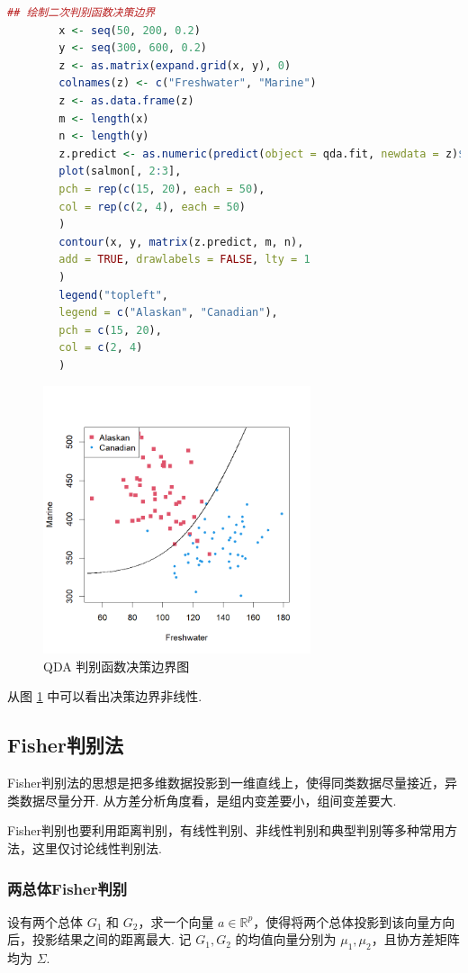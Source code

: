 \documentclass[12pt, a4paper, oneside]{ctexart}
\begin{document}
	\begin{lstlisting}[language=R]
		## 绘制二次判别函数决策边界
		x <- seq(50, 200, 0.2)
		y <- seq(300, 600, 0.2)
		z <- as.matrix(expand.grid(x, y), 0)
		colnames(z) <- c("Freshwater", "Marine")
		z <- as.data.frame(z)
		m <- length(x)
		n <- length(y)
		z.predict <- as.numeric(predict(object = qda.fit, newdata = z)$class)
		plot(salmon[, 2:3],
		pch = rep(c(15, 20), each = 50),
		col = rep(c(2, 4), each = 50)
		)
		contour(x, y, matrix(z.predict, m, n),
		add = TRUE, drawlabels = FALSE, lty = 1
		)
		legend("topleft",
		legend = c("Alaskan", "Canadian"),
		pch = c(15, 20),
		col = c(2, 4)
		)
	\end{lstlisting}
	\begin{figure}[htbp]
		\centering
		\includegraphics[width=0.7\textwidth]{../Figure/qda_boundary_plot.png}
		\caption{QDA 判别函数决策边界图}
		\label{fig:qda}
	\end{figure}
	从图 \ref{fig:qda} 中可以看出决策边界非线性.
	
	\subsection{Fisher判别法}
	Fisher判别法的思想是把多维数据投影到一维直线上，使得同类数据尽量接近，异类数据尽量分开. 从方差分析角度看，是组内变差要小，组间变差要大.
	
	Fisher判别也要利用距离判别，有线性判别、非线性判别和典型判别等多种常用方法，这里仅讨论线性判别法.
	\subsubsection{两总体Fisher判别}
	设有两个总体 \(G_1\) 和 \(G_2\)，求一个向量 \(a \in \mathbb{R}^p\)，使得将两个总体投影到该向量方向后，投影结果之间的距离最大. 记 \(G_1, G_2\) 的均值向量分别为 \(\mu_1, \mu_2\)，且协方差矩阵均为 \(\Sigma\).
	
\end{document}
